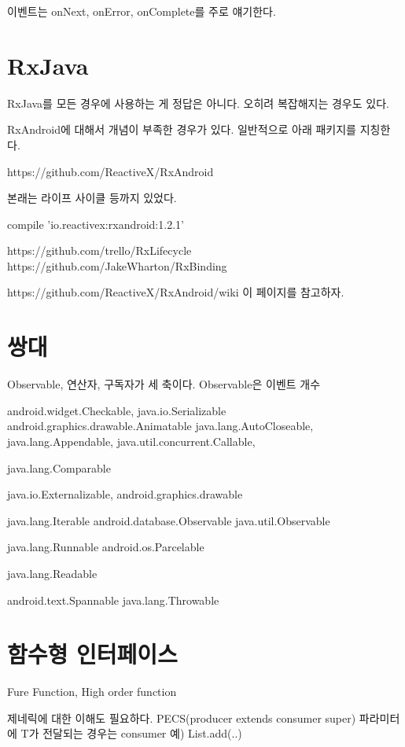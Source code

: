 \documentclass{book}
\begin{document}
이벤트는 onNext, onError, onComplete를 주로 얘기한다.

\section{RxJava}
RxJava를 모든 경우에 사용하는 게 정답은 아니다.
오히려 복잡해지는 경우도 있다.

RxAndroid에 대해서 개념이 부족한 경우가 있다. 일반적으로 아래 패키지를 지칭한다.

https://github.com/ReactiveX/RxAndroid

본래는 라이프 사이클 등까지 있었다.


compile 'io.reactivex:rxandroid:1.2.1' 



https://github.com/trello/RxLifecycle
https://github.com/JakeWharton/RxBinding

https://github.com/ReactiveX/RxAndroid/wiki 이 페이지를 참고하자.

\section{쌍대}

Observable, 연산자, 구독자가 세 축이다.
Observable은 이벤트 개수



android.widget.Checkable, java.io.Serializable
android.graphics.drawable.Animatable
java.lang.AutoCloseable, java.lang.Appendable, 
java.util.concurrent.Callable,

java.lang.Comparable

java.io.Externalizable, 
android.graphics.drawable

java.lang.Iterable
	android.database.Observable
		java.util.Observable
		
java.lang.Runnable
android.os.Parcelable

java.lang.Readable

android.text.Spannable
	java.lang.Throwable

\section{함수형 인터페이스}
Fure Function, High order function


제네릭에 대한 이해도 필요하다.
PECS(producer extends consumer super)
파라미터에 T가 전달되는 경우는 consumer
예) List.add(..)

\end{document}

